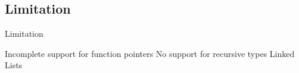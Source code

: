 \documentclass[aspectratio=1610]{ctexbeamer}
\begin{document}
\subsection{Limitation}
\begin{frame}{Limitation}
    \begin{outline}
        \1 Incomplete support for function pointers
        \1 No support for recursive types
            \2 Linked Lists
    \end{outline}
\end{frame}
\end{document}
